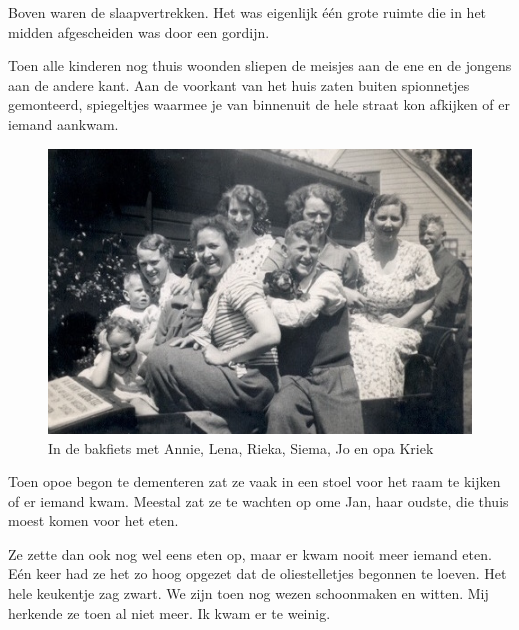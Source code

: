 \documentclass[12pt,twoside, openright]{memoir}
\begin{document}
Boven waren de slaapvertrekken. Het was eigenlijk één grote ruimte die in het midden afgescheiden was door een gordijn. 

Toen alle kinderen nog thuis woonden sliepen de meisjes aan de ene en de jongens aan de andere kant. Aan de voorkant van het huis zaten buiten spionnetjes gemonteerd, spiegeltjes waarmee je van binnenuit de hele straat kon afkijken of er iemand aankwam. 

\begin{figure}
\includegraphics[width=\textwidth]{img/ch3/indebakfiets}
\caption*{\footnotesize In de bakfiets met Annie, Lena, Rieka, Siema, Jo en opa Kriek}
\end{figure}

Toen opoe begon te dementeren zat ze vaak in een stoel voor het raam te kijken of er iemand kwam. Meestal zat ze te wachten op ome Jan, haar oudste, die thuis moest komen voor het eten. 

Ze zette dan ook nog wel eens eten op, maar er kwam nooit meer iemand eten. Eén keer had ze het zo hoog opgezet dat de oliestelletjes begonnen te loeven. Het hele keukentje zag zwart. We zijn toen nog wezen schoonmaken en witten. Mij herkende ze toen al niet meer. Ik kwam er te weinig.
\end{document}
